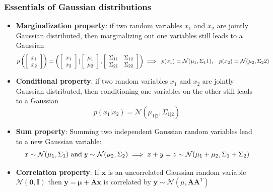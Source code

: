 \subsubsection{Essentials of Gaussian distributions}
\begin{itemize}
	\item \textbf{Marginalization property}: if two random variables $x_1$ and $x_2$ are jointly Gaussian distributed, then marginalizing out one variables still leads to a Gaussian
	$$p\left(\left[\begin{array}{c}
	x_1 \\ x_2
	\end{array}\right]\right) = \left(\left[\begin{array}{c}
	x_1\\x_2
	\end{array}\right]|\left[\begin{array}{c}
	\mu_1\\\mu_2
	\end{array}\right], \left[\begin{array}{cc}
	\Sigma_{11} & \Sigma_{12} \\ \Sigma_{21} & \Sigma_{22} 
	\end{array}\right]\right)\implies\hspace{1mm} p(x_1) = \mathcal{N}(\mu_1, \Sigma_11),\hspace{3mm} p(x_2) = \mathcal{N}(\mu_2, \Sigma_22)$$
	\item \textbf{Conditional property}: if two random variables $x_1$ and $x_2$ are jointly Gaussian distributed, then conditioning one variables on the other still leads to a Gaussian
	$$p(x_1|x_2) = \mathcal{N}(\mu_{1|2}, \Sigma_{1|2})$$
	\item \textbf{Sum property}: Summing two independent Gaussian random variables lead to a new Gaussian variable:
	$$x\sim \mathcal{N}(\mu_1, \Sigma_1) \text{\hspace{1mm}and\hspace{1mm}} y\sim \mathcal{N}(\mu_2, \Sigma_2) \implies x+y=z\sim\mathcal{N}(\mu_1+\mu_2, \Sigma_1+\Sigma_2) $$ 
	\item \textbf{Correlation property}: If $\bm{x}$ is an uncorrelated Gaussian random variable $\mathcal{N}(\bm{0}, \bm{I})$ then $\bm{y} = \bm{\mu} + \bm{A}\bm{x}$ is correlated by $\bm{y}\sim\mathcal{N}(\mu, \bm{A}\bm{A}^T)$
\end{itemize}
